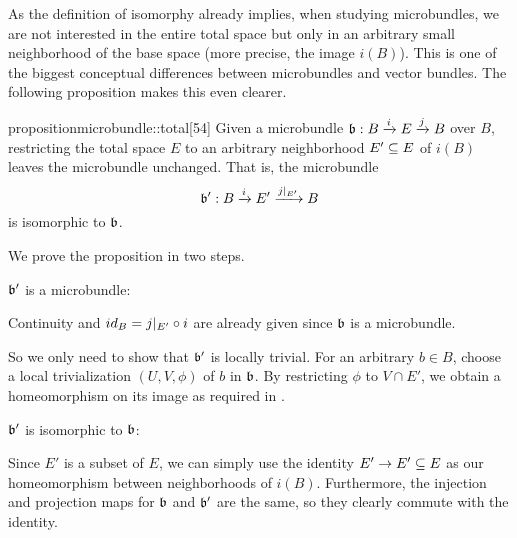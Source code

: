 \begin{myparagraph}
    As the definition of isomorphy already implies, when studying microbundles,
    we are not interested in the entire total space
    but only in an arbitrary small neighborhood of the base space (more precise, the image $i(B)$).
    This is one of the biggest conceptual differences between
    microbundles and vector bundles.
    The following proposition makes this even clearer.
    
\end{myparagraph}

\begin{mystatement}{proposition}{microbundle::total}[54]
    Given a microbundle $\bundledef{\bb}{B}{E}{i}{j}$ over $B$,
    restricting the total space $E$ to an
    arbitrary neighborhood $E' \subseteq{} E$ of $i(B)$ leaves the microbundle unchanged.
    That is, the microbundle
    \[ \bundledef{\bb'}{B}{E'}{i}{j\restr{E'}} \]
    is isomorphic to $\bb$.
\end{mystatement}

\begin{myproof}
    We prove the proposition in two steps.
    \begin{steps}
        \item $\bb'$ is a microbundle:
        
        Continuity and $id_B = j\vert_{E'} \circ i$ are already given since $\bb$ is a microbundle.

        So we only need to show that $\bb'$ is locally trivial.
        For an arbitrary $b \in B$, choose a local trivialization $(U, V, \phi)$ of $b$ in $\bb$.
        By restricting $\phi$ to $V \cap E'$,
        we obtain a homeomorphism on its image as required in .
        
        \item $\bb'$ is isomorphic to $\bb$:

        Since $E'$ is a subset of $E$,
        we can simply use the identity $E' \to E' \subseteq{} E$
        as our homeomorphism between neighborhoods of $i(B)$.
        Furthermore, the injection and projection maps for $\bb$ and $\bb'$ are the same,
        so they clearly commute with the identity.
    \end{steps}
\end{myproof}
